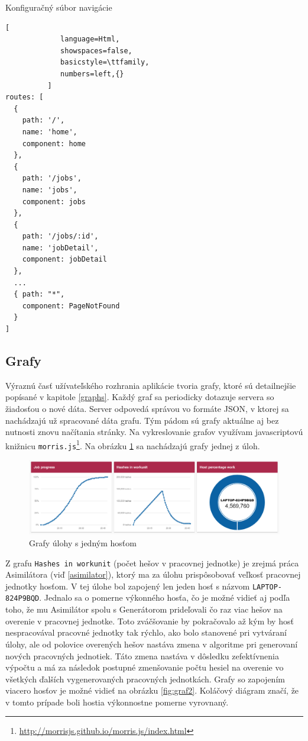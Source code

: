 \documentclass[slovak]{fitthesis}
\begin{document}
\begin{algorithm}[H]
  \caption{Konfiguračný súbor navigácie}
  \label{routerConfig}
  \begin{lstlisting}[
             language=Html,
             showspaces=false,
             basicstyle=\ttfamily,
             numbers=left,{}
          ]
routes: [
  {
    path: '/',
    name: 'home',
    component: home
  },
  {
    path: '/jobs',
    name: 'jobs',
    component: jobs
  },
  {
    path: '/jobs/:id',
    name: 'jobDetail',
    component: jobDetail
  },
  ...
  { path: "*",
    component: PageNotFound
  }
]
  \end{lstlisting}
\end{algorithm}


\subsection{Grafy}
Výraznú časť užívateľského rozhrania aplikácie tvoria grafy, ktoré sú detailnejšie popísané v kapitole \ref{graphs}. Každý graf sa periodicky dotazuje servera so žiadosťou o nové dáta. Server odpovedá správou vo formáte JSON, v ktorej sa nachádzajú už spracované dáta grafu. Tým pádom sú grafy aktuálne aj bez nutnosti znovu načítania stránky. Na vykreslovanie grafov využívam javascriptovú knižnicu \texttt{morris.js}\footnote{\url{http://morrisjs.github.io/morris.js/index.html}}. Na obrázku \ref{fig:graf1} sa nachádzajú grafy jednej z úloh.
\begin{figure}[H]
    \centering
    \includegraphics[scale=0.53]{obrazky/graf1.PNG}
    \caption{Grafy úlohy s jedným hosťom}
    \label{fig:graf1}
\end{figure} 
Z grafu \texttt{Hashes in workunit} (počet hešov v pracovnej jednotke) je zrejmá práca Asimilátora (viď \ref{asimilator}), ktorý ma za úlohu prispôsobovať veľkosť pracovnej jednotky hosťom. V tej úlohe bol zapojený len jeden hosť s názvom \texttt{LAPTOP-824P9BQD}. Jednalo sa o pomerne výkonného hosťa, čo je možné vidieť aj podľa toho, že mu Asimilátor spolu s Generátorom prideľovali čo raz viac hešov na overenie v pracovnej jednotke. Toto zváčšovanie by pokračovalo až kým by hosť nespracovával pracovné jednotky tak rýchlo, ako bolo stanovené pri vytváraní úlohy, ale od polovice overených hešov nastáva zmena v algoritme pri generovaní nových pracovných jednotiek. Táto zmena nastáva v dôsledku zefektívnenia výpočtu a má za následok postupné zmenšovanie počtu hesiel na overenie vo všetkých ďalších vygenerovaných pracovných jednotkách.  Grafy so zapojením viacero hosťov je možné vidieť na obrázku \ref{fig:graf2}. Koláčový diágram značí, že v tomto prípade boli hostia výkonnostne pomerne vyrovnaný. 
\end{document}
